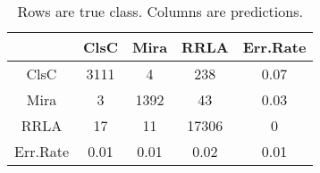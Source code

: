 \begin{table}[htb]
\begin{center}
\begin{tabular}{cccc|c}
  & ClsC & Mira & RRLA & Err.Rate \\ 
  \hline
ClsC & 3111 & 4 & 238 & 0.07 \\ 
  Mira & 3 & 1392 & 43 & 0.03 \\ 
  RRLA & 17 & 11 & 17306 & 0 \\ 
   \hline
Err.Rate & 0.01 & 0.01 & 0.02 & 0.01 \\ 
  \end{tabular}
\caption{Rows are true class. Columns are predictions.}
\end{center}
\end{table}
